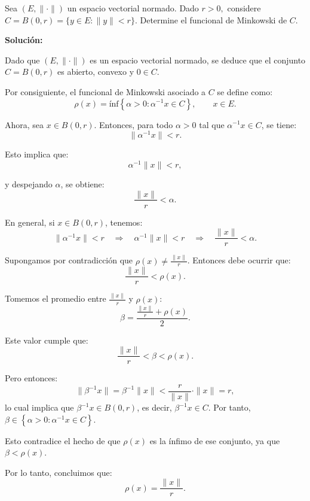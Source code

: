 Sea $(E,\|\cdot\|)$ un espacio vectorial normado. Dado $r>0,$ considere $C=B(0,r)=\{y\in E:\|y\|<r\}.$ Determine el funcional de Minkowski de $C.$


\textbf{Solución:}

Dado que $(E, \| \cdot \|)$ es un espacio vectorial normado, se deduce que el conjunto $C = B(0,r)$ es abierto, convexo y  $0 \in C$.

Por consiguiente, el funcional de Minkowski asociado a $C$ se define como:
\[
\rho(x) = \text{ínf} \left\{ \alpha > 0 : \alpha^{-1}x \in C \right\}, \qquad x \in E.
\]

Ahora, sea $x \in B(0,r)$. Entonces, para todo $\alpha > 0$ tal que $\alpha^{-1}x \in C$, se tiene:
\[
\| \alpha^{-1}x \| < r.
\]

Esto implica que:
\[
\alpha^{-1} \| x \| < r,
\]

y despejando $\alpha$, se obtiene:
\[
\frac{\| x \|}{r} < \alpha.
\]

En general, si $x \in B(0,r)$, tenemos:
\[
\| \alpha^{-1}x \| < r \quad \Rightarrow \quad \alpha^{-1} \| x \| < r \quad \Rightarrow \quad \frac{\| x \|}{r} < \alpha.
\]

Supongamos por contradicción que $\rho(x) \neq \frac{\| x \|}{r}$. Entonces debe ocurrir que:
\[
\frac{\| x \|}{r} < \rho(x).
\]

Tomemos el promedio entre $\frac{\| x \|}{r}$ y $\rho(x)$:
\[
\beta = \frac{\frac{\| x \|}{r} + \rho(x)}{2}.
\]

Este valor cumple que:
\[
\frac{\| x \|}{r} < \beta < \rho(x).
\]

Pero entonces:
\[
\| \beta^{-1}x \| = \beta^{-1} \| x \| < \frac{r}{\| x \|} \cdot \| x \| = r,
\]
lo cual implica que $\beta^{-1}x \in B(0,r)$, es decir, $\beta^{-1}x \in C$. Por tanto, $\beta \in \left\{ \alpha > 0 : \alpha^{-1}x \in C \right\}$.

Esto contradice el hecho de que $\rho(x)$ es la ínfimo de ese conjunto, ya que $\beta < \rho(x)$.

Por lo tanto, concluimos que:
\[
\rho(x) = \frac{\| x \|}{r}.
\]